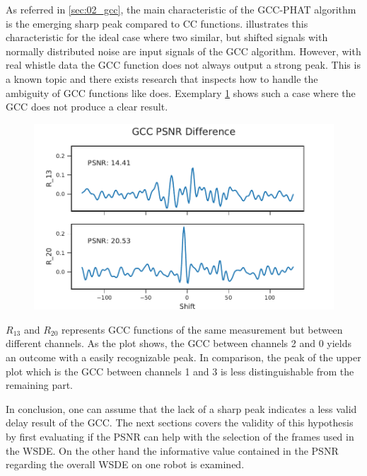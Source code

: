 As referred in \cref{sec:02_gcc}, the main characteristic of the \ac{GCC-PHAT}
algorithm is the emerging sharp peak compared to \ac{CC} functions.
 illustrates this characteristic for the ideal case where
two similar, but shifted signals with normally distributed noise are
input signals of the \ac{GCC} algorithm.
However, with real whistle data the \ac{GCC} function does not always
output a strong peak.
This is a known topic and there exists research that inspects how to handle
the ambiguity of \ac{GCC} functions like \cite{optimal_peak_localization} does.
Exemplary \cref{fig:04_psnrExample} shows such a case where the \ac{GCC} does not produce
a clear result.
\begin{figure}[h]
	\centering
	\includegraphics[]{figures/evaluation/psnr_example}
	\caption{}
	\label{fig:04_psnrExample}
\end{figure}

$R_{13}$ and $R_{20}$ represents \ac{GCC} functions of the same measurement
but between different channels.
As the plot shows, the \ac{GCC} between channels 2 and 0 yields an outcome
with a easily recognizable peak.
In comparison, the peak of the upper plot which is the \ac{GCC} between channels 1 and 3
is less distinguishable from the remaining part.


In conclusion, one can assume that the lack of a sharp peak indicates
a less valid delay result of the \ac{GCC}.
The next sections covers the validity of this hypothesis by first evaluating
if the \ac{PSNR} can help with the selection of the frames used in the \ac{WSDE}.
On the other hand the informative value contained in the \ac{PSNR} regarding the
overall \ac{WSDE} on one robot is examined.

